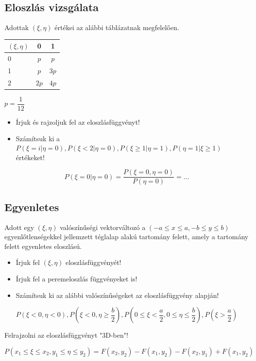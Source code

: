 \documentclass[a4paper]{article}
\newenvironment{solution}
{\color{RoyalBlue}}{\bigskip}
\begin{document}
\subsection{Eloszlás vizsgálata}

Adottak $(\xi, \eta)$ értékei az alábbi táblázatnak megfelelően.

\begin{tabular}{l|c|c|}
$(\xi, \eta)$ & 0 & 1 \\
\hline
0 & $p$ & $p$ \\
1 & $p$ & $3p$ \\
2 & $2p$ & $4p$ \\
\hline
\end{tabular}

$p = \dfrac{1}{12}$

\begin{itemize}
\item Írjuk és rajzoljuk fel az eloszlásfüggvényt!
\item Számítsuk ki a $P(\xi = i|\eta = 0), P(\xi < 2|\eta = 0), P(\xi \geq 1|\eta = 1), P(\eta = 1|\xi \geq 1)$ értékeket!
\end{itemize}

\begin{solution}
\[
P(\xi = 0|\eta = 0) = \dfrac{P(\xi = 0, \eta = 0)}{P(\eta = 0)} = \ldots
\]
\end{solution}

\subsection{Egyenletes}

Adott egy $(\xi, \eta)$ valószínűségi vektorváltozó a $(-a \leq x \leq a, -b \leq y \leq b)$ egyenlőtlenségekkel jellemzett téglalap alakú tartomány felett, amely a tartomány felett egyenletes eloszlású.

\begin{itemize}
\item Írjuk fel $(\xi, \eta)$ eloszlásfüggvényét!
\item Írjuk fel a peremeloszlás függvényeket is!
\item Számítsuk ki az alábbi valószínűségeket az eloszlásfüggvény alapján!
\end{itemize}
\[
P(\xi < 0, \eta < 0), P\left(\xi < 0, \eta \geq \dfrac{b}{2}\right),
P\left(0 \leq \xi < \dfrac{a}{2}, 0 \leq \eta \leq \dfrac{b}{2}\right), P\left(\xi > \dfrac{a}{2}\right)
\]

\begin{solution}
Felrajzolni az eloszlásfüggvényt "3D-ben"!

\[
P(x_1 \leq \xi \leq x_2, y_1 \leq \eta \leq y_2) =
F(x_2, y_2) - F(x_1, y_2) - F(x_2, y_1) + F(x_1, y_2)
\]
\end{solution}
\end{document}
